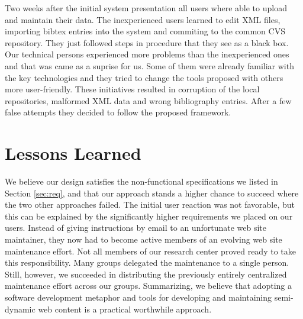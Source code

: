 \documentclass[10pt]{article}
\begin{document}
Two weeks after the initial system presentation all users where able to upload 
and maintain their data. The inexperienced users learned to edit XML files,
importing bibtex entries into the system and commiting to the common CVS repository. 
They just followed steps in procedure that they see as a black box. 
Our technical persons experienced more problems than the inexperienced ones 
and that was came as a suprise for us. Some of them were already familiar 
with the key technologies and they tried to change the tools proposed with others more user-friendly. 
These initiatives resulted in corruption of the local repositories, malformed XML data and wrong bibliography entries.
After a few false attempts they decided to follow the proposed framework.

\section{Lessons Learned}
\label{sec:concl}
We believe our design satisfies the non-functional specifications
we listed in Section \ref{sec:req},
and that our approach stands a higher chance to succeed where the
two other approaches failed.
The initial user reaction was not favorable, but this can
be explained by the significantly higher requirements we
placed on our users.
Instead of giving instructions by email to an unfortunate
web site maintainer, they now had to become active members
of an evolving web site maintenance effort.
Not all members of our research center proved ready to take
this responsibility.
Many groups delegated the maintenance to a single person.
Still, however, we succeeded in distributing the previously
entirely centralized maintenance effort across our groups.
Summarizing, we believe that adopting a software development
metaphor and tools for developing and maintaining semi-dynamic
web content is a practical worthwhile approach.



\end{document}
